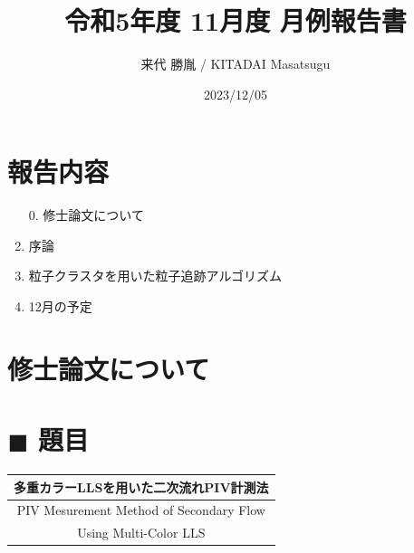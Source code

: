 \documentclass[twocolumn,a4j]{jsarticle}
\author{来代 勝胤 / KITADAI Masatsugu}
\title{令和5年度 11月度 月例報告書}
\date{2023/12/05}
\begin{document}
\columnseprule=0.1mm
\maketitle

\section*{報告内容}
\begin{enumerate}[1.]
  \item [0.] 修士論文について
  \item 序論
  \item 粒子クラスタを用いた粒子追跡アルゴリズム
  \item 12月の予定
\end{enumerate}

\setcounter{section}{-1}
\section{修士論文について}

\begin{table}[hbtp]
  \section*{$\blacksquare$ 題目}
  \centering
  \begin{tabular}{c}
    \hline
    多重カラーLLSを用いた二次流れPIV計測法  \\ \hline
    PIV Mesurement Method of Secondary Flow \\
    Using Multi-Color LLS                   \\ \hline
  \end{tabular}
\end{table}
\end{document}
